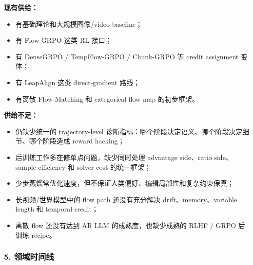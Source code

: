 \textbf{现有供给：}

\begin{itemize}[leftmargin=1.5em]
  \item 有基础理论和大规模图像/video baseline；
  \item 有 Flow-GRPO 这类 RL 接口；
  \item 有 DenseGRPO / TempFlow-GRPO / Chunk-GRPO 等 credit assignment 变体；
  \item 有 LeapAlign 这类 direct-gradient 路线；
  \item 有离散 Flow Matching 和 categorical flow map 的初步框架。
\end{itemize}

\textbf{供给不足：}

\begin{itemize}[leftmargin=1.5em]
  \item 仍缺少统一的 trajectory-level 诊断指标：哪个阶段决定语义、哪个阶段决定细节、哪个阶段造成 reward hacking；
  \item 后训练工作多在修单点问题，缺少同时处理 advantage side、ratio side、sample efficiency 和 solver cost 的统一框架；
  \item 少步蒸馏常优化速度，但不保证人类偏好、编辑局部性和复杂约束保真；
  \item 长视频/世界模型中的 flow path 还没有充分解决 drift、memory、variable length 和 temporal credit；
  \item 离散 flow 还没有达到 AR LLM 的成熟度，也缺少成熟的 RLHF / GRPO 后训练 recipe。
\end{itemize}

\subsubsection*{5. 领域时间线}

